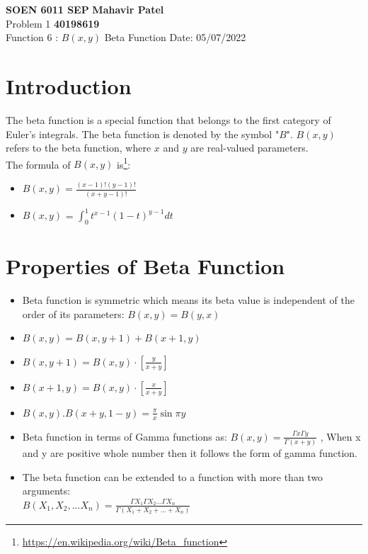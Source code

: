 \documentclass[a4paper, 12pt]{article}
\begin{document}
\noindent
\large\textbf{SOEN 6011 SEP} \hfill \textbf{Mahavir Patel} \\
\normalsize Problem 1 \hfill \textbf{40198619} \\
Function 6 :  $B(x,y)$ Beta Function \hfill Date: 05/07/2022 \\

\section{Introduction}
The beta function is a special function that belongs to the first category of Euler's integrals. The beta function is denoted by the symbol  "${B}$". $B(x,y)$ refers to the beta function, where $x$ and $y$ are real-valued parameters. \\
The formula of \textbf{$B(x,y)$} is\footnote{\href{https://en.wikipedia.org/wiki/Beta\_function}{https://en.wikipedia.org/wiki/Beta\_function}}:
    \begin{itemize}
        \item $B(x,y) = \frac{(x-1)! (y-1)!}{(x+y-1)!}$ 
        \item $B(x,y)$ = $\int_{0}^{1} {t^{x-1}}{(1-t)^{y-1}} dt$ 
    \end{itemize}

\section{Properties of Beta Function}
    \begin{itemize}[noitemsep]
        \item Beta function is symmetric which means its beta value is independent of the order of its parameters: $B(x,y) = B(y,x)$
        \item $B(x,y) = B(x,y+1) + B(x+1,y)$
        \item $B(x,y+1) = B(x,y) \cdot [\frac{y}{x+y}]$
        \item $B(x+1,y) = B(x,y) \cdot [\frac{x}{x+y}]$
        \item $B(x,y) . B(x+y,1-y) = \frac{\pi}{x}\sin{\pi y}$
        \item Beta function in terms of Gamma functions as:
            $B(x,y)=\frac{\Gamma x \Gamma y}{\Gamma (x+y)}$ , When x and y are positive whole number then it follows the form of gamma function.
        \item The beta function can be extended to a function with more than two arguments:\\ $B(X_{1},X_{2},...X_{n}) = \frac{\Gamma X_{1} \Gamma X_{2} ... \Gamma X_{n}}{ \Gamma (X_{1} + X_{2} + ... + X_{n})}$
    \end{itemize}
\end{document}
